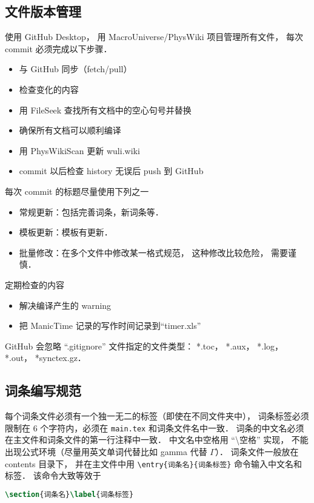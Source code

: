 \subsection{文件版本管理}
使用 GitHub Desktop， 用 MacroUniverse/PhysWiki 项目管理所有文件， 每次 commit 必须完成以下步骤．
\begin{itemize}
\item 与 GitHub 同步（fetch/pull）
\item 检查变化的内容
\item 用 FileSeek 查找所有文档中的空心句号并替换
\item 确保所有文档可以顺利编译
\item 用 PhysWikiScan 更新 wuli.wiki
\item commit 以后检查 history 无误后 push 到 GitHub
\end{itemize}
每次 commit 的标题尽量使用下列之一
\begin{itemize}
\item 常规更新：包括完善词条，新词条等．
\item 模板更新：模板有更新．
\item 批量修改：在多个文件中修改某一格式规范， 这种修改比较危险， 需要谨慎．
\end{itemize}
定期检查的内容
\begin{itemize}
\item 解决编译产生的 warning
\item 把 ManicTime 记录的写作时间记录到“timer.xls”
\end{itemize}

GitHub 会忽略 “.gitignore” 文件指定的文件类型： *.toc， *.aux， *.log， *.out， *synctex.gz．

\subsection{词条编写规范}

每个词条文件必须有一个独一无二的标签（即使在不同文件夹中）， 词条标签必须限制在 6 个字符内，必须在 \verb|main.tex| 和词条文件名中一致． 词条的中文名必须在主文件和词条文件的第一行注释中一致． 中文名中空格用 “\textbackslash 空格” 实现， 不能出现公式环境（尽量用英文单词代替比如 gamma 代替 $\Gamma$）． 词条文件一般放在 contents 目录下， 并在主文件中用 \verb|\entry{词条名}{词条标签}| 命令输入中文名和标签． 该命令大致等效于

\begin{lstlisting}[language=latex]
\section{词条名}\label{词条标签}
\end{lstlisting}

